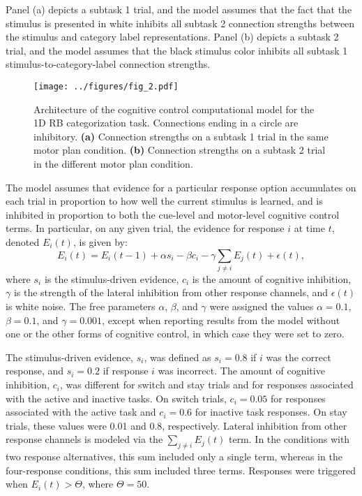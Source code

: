 \documentclass[doc, floatsintext]{apa7}
\begin{document}
Panel (a) depicts a subtask 1 trial, and the model assumes
that the fact that the stimulus is presented in white
inhibits all subtask 2 connection strengths between the
stimulus and category label representations. Panel (b)
depicts a subtask 2 trial, and the model assumes that the
black stimulus color inhibits all subtask 1
stimulus-to-category-label connection strengths.  

\begin{figure}[h!]
    \centering
    \texttt{[image: ../figures/fig\_2.pdf]}
    \caption{
        Architecture of the cognitive control computational
        model for the 1D RB categorization task. Connections
        ending in a circle are inhibitory. \textbf{(a)}
        Connection strengths on a subtask 1 trial in the same
        motor plan condition. \textbf{(b)} Connection strengths
        on a subtask 2 trial in the different motor plan
        condition.}
    \label{fig_2}
\end{figure}

The model assumes that evidence for a particular response
option accumulates on each trial in proportion to how well
the current stimulus is learned, and is inhibited in
proportion to both the cue-level and motor-level cognitive
control terms. In particular, on any given trial, the
evidence for response $i$ at time $t$, denoted  $E_i(t)$, is
given by:
\begin{equation}
    E_i(t) = E_i(t-1) + \alpha s_i - \beta c_i - \gamma \sum_{j \neq i} E_{j}(t) + \epsilon (t),
    \label{diffusion_model}
\end{equation}
where $s_i$ is the stimulus-driven evidence, $c_i$ is the
amount of cognitive inhibition, $\gamma$ is the strength of
the lateral inhibition from other response channels, and
$\epsilon (t)$ is white noise. The free parameters $\alpha$,
$\beta$, and $\gamma$ were assigned the values $\alpha=0.1$,
$\beta=0.1$, and $\gamma=0.001$, except when reporting
results from the model without one or the other forms of
cognitive control, in which case they were set to zero.

The stimulus-driven evidence, $s_i$, was defined as $s_i =
0.8$ if $i$ was the correct response, and $s_{i} = 0.2$ if
response $i$ was incorrect. The amount of cognitive
inhibition, $c_i$, was different for switch and stay trials
and for responses associated with the active and inactive
tasks. On switch trials, $c_i = 0.05$ for responses
associated with the active task and $c_i = 0.6$ for inactive
task responses. On stay trials, these values were 0.01 and
0.8, respectively. Lateral inhibition from other response
channels is modeled via the $\sum_{j \neq i} E_{j}(t)$ term.
In the conditions with two response alternatives, this sum
included only a single term, whereas in the four-response
conditions, this sum included three terms. Responses were
triggered when $E_i(t) > \Theta$, where $\Theta = 50$. 
\end{document}
